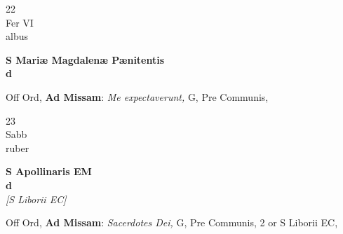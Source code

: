 \documentclass[10pt, openany]{book}
\begin{document}
        \begin{center}
            \begin{minipage}{3.5in}
                \vspace{2em}
                \begin{minipage}{0.5in}
                    {\Huge 22} \\
                    {\normalsize Fer VI} \\
                    {\normalsize albus}
                \end{minipage}
                \begin{minipage}{3.0in}
                    \textbf{ \large S Mariæ Magdalenæ Pænitentis \\
                    \textnormal{\normalsize d}} \\ 
                \end{minipage}
                \begin{justify}Off Ord, \textbf{Ad Missam}: \textit{Me expectaverunt,} G, Pre Communis,   
                \end{justify}
            \end{minipage}
        \end{center}
    
        \begin{center}
            \begin{minipage}{3.5in}
                \vspace{2em}
                \begin{minipage}{0.5in}
                    {\Huge 23} \\
                    {\normalsize Sabb} \\
                    {\normalsize ruber}
                \end{minipage}
                \begin{minipage}{3.0in}
                    \textbf{ \large S Apollinaris EM \\
                    \textnormal{\normalsize d}} \\ \textit{[S Liborii EC]} \\ 
                \end{minipage}
                \begin{justify}Off Ord, \textbf{Ad Missam}: \textit{Sacerdotes Dei,} G, Pre Communis, 2 or S Liborii EC,   
                \end{justify}
            \end{minipage}
        \end{center}
    
\end{document}
